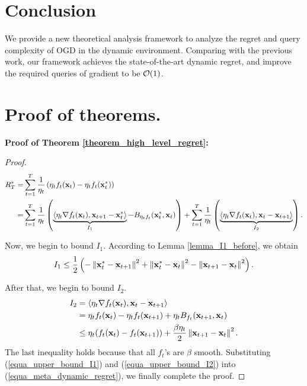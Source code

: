 \documentclass{article}
\begin{document}
\section{Conclusion}
\label{sect_conclude}
We provide a new theoretical analysis framework to analyze the regret and query complexity of OGD in the dynamic environment. Comparing with the previous work, our framework achieves the state-of-the-art dynamic regret, and improve the required queries of gradient to be ${\mathcal{O}}(1)$. 






\appendix

\section*{Proof of theorems.}

\textbf{Proof of Theorem \ref{theorem_high_level_regret}:}

\begin{proof}
\begin{align}
\nonumber
 R_T^{\ast}  =& \sum\limits_{t=1}^T \frac{1}{\eta_t} \left( \eta_t f_t({\bf x}_t) -  \eta_t f_t({\bf x}_t^{\ast}) \right) \\ \label{equa_meta_dynamic_regret}
=& \sum_{t=1}^T\frac{1}{\eta_t} \left(  \underbrace{\langle \eta_t\nabla f_t({\bf x}_t), {\bf x}_{t+1}-{\bf x}_t^{\ast}\rangle}_{I_1} -  B_{\eta_t f_t}({\bf x}_t^{\ast}, {\bf x}_t)  \right)  + \sum_{t=1}^T\frac{1}{\eta_t} \left(  \underbrace{\langle \eta_t\nabla f_t({\bf x}_t), {\bf x}_t-{\bf x}_{t+1} \rangle}_{I_2}  \right).
\end{align}

Now, we begin to bound $I_1$. According to Lemma \ref{lemma_I1_before}, we obtain
\begin{align}
\label{equa_upper_bound_I1}
I_1  \le  \frac{1}{2}\left( -  \left\lVert{\bf x}_t^{\ast} - {\bf x}_{t+1}\right\rVert^2   + \left\lVert {\bf x}_t^{\ast} - {\bf x}_t \right\rVert^2 - \left\lVert{\bf x}_{t+1} - {\bf x}_t\right\rVert^2 \right).
\end{align}

After that, we begin to bound  $I_2$. 
\begin{align}
\nonumber
I_2 &= \langle \eta_t\nabla f_t({\bf x}_t), {\bf x}_t-{\bf x}_{t+1} \rangle \\ \nonumber
&= \eta_t f_t({\bf x}_t) - \eta_t f_t({\bf x}_{t+1}) + \eta_t B_{f_t}({\bf x}_{t+1}, {\bf x}_t)  \\  \label{equa_upper_bound_I2}
&\le \eta_t(f_t({\bf x}_t) - f_t({\bf x}_{t+1})) +  \frac{\beta \eta_t}{2}\left\lVert{\bf x}_{t+1} - {\bf x}_t\right\rVert^2.
\end{align} The last inequality holds because that all $f_t$'s are $\beta$ smooth. Substituting  (\ref{equa_upper_bound_I1}) and (\ref{equa_upper_bound_I2}) into (\ref{equa_meta_dynamic_regret}), we  finally complete the proof.
\end{proof}
\end{document}
